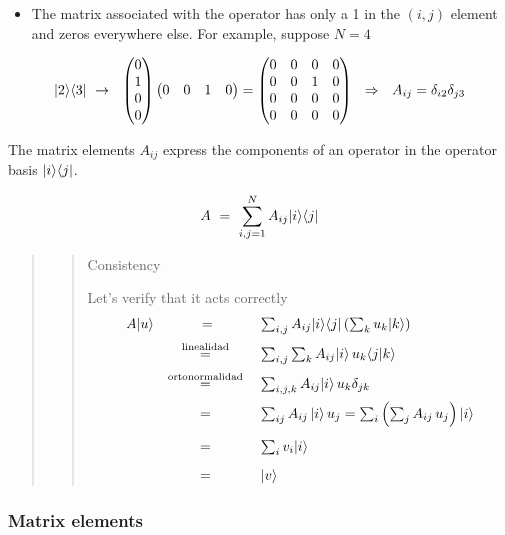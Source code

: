 \documentclass[11pt]{article}
\providecommand{\tightlist}{%
      \setlength{\itemsep}{0pt}\setlength{\parskip}{0pt}}
\begin{document}
    \begin{itemize}
\tightlist
\item
  The matrix associated with the operator has only a 1 in the \((i,j)\)
  element and zeros everywhere else. For example, suppose \(N=4\)
\end{itemize}

\[
| 2\rangle \langle 3| ~\to ~~
 \begin{pmatrix} 0 \\ 1 \\ 0 \\ 0 \end{pmatrix}\begin{pmatrix} 0 & 0 & 1 & 0 \end{pmatrix} = 
\begin{pmatrix}
0 &  0 & 0 &  0 \\  0 &  0 & 1&  0 \\ 0 &  0 & 0 &  0 \\ 0 &  0 & 0 &  0
\end{pmatrix} ~~\Rightarrow ~~ A_{ij} = \delta_{i2}\delta_{j3}
\]

    The matrix elements \(A_{ij}\) express the components of an operator in
the operator basis \(| i\rangle \langle j|\).

    \[
A ~=~ \sum_{i,j=1}^N A_{ij} | i\rangle \langle j| 
\]

    \begin{quote}
\begin{quote}
Consistency

Let's verify that it acts correctly \[
\begin{array}{rcl}
A |u\rangle &=&  \sum_{i,j} A_{ij} \ketbra{i}{j}  \left(\sum_k u_k |k\rangle \right) \\
&\stackrel{\rm linealidad}{=} \rule{0mm}{6mm}& \sum_{i,j} \sum_k A_{ij} | i\rangle  \,   u_k \langle j| k\rangle \nonumber\\
&\stackrel{\rm ortonormalidad}{=}\rule{0mm}{6mm}& \sum_{i,j,k} A_{ij} | i\rangle  \,   u_k \delta_{jk}\\
&=\rule{0mm}{6mm}&\sum_{ij} A_{ij}\,|i\rangle \, u_j= \sum_i \left(\sum_{j} A_{ij}\, u_j\right)  |i\rangle    \\
&=\rule{0mm}{6mm}&\sum_i v_i \ket{i} \nonumber\\
&=\rule{0mm}{6mm}&   | v\rangle
\end{array}
\]
\end{quote}
\end{quote}

    \subsubsection{Matrix elements}\label{matrix-elements}
\end{document}
